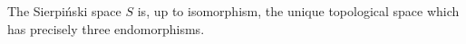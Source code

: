 The Sierpiński space $S$ is, up to isomorphism, the unique topological space which has
precisely three endomorphisms.
